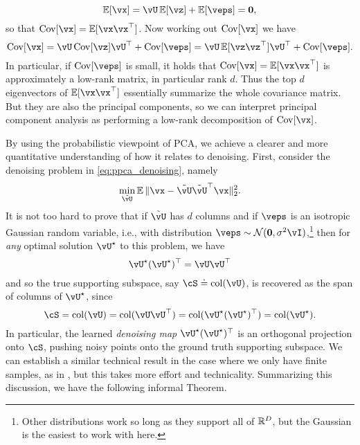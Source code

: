 \documentclass[../../book-main.tex]{subfiles}
\begin{document}
\begin{equation}
    \Ex[\vx] = \vU\Ex[\vz] + \Ex[\veps] = \vzero,
\end{equation}
so that \(\Cov[\vx] = \Ex[\vx\vx^{\top}]\). Now working out \(\Cov[\vx]\) we have 
\begin{equation}
    \Cov[\vx] = \vU\Cov[\vz]\vU^{\top} + \Cov[\veps] = \vU\Ex[\vz\vz^{\top}]\vU^{\top} + \Cov[\veps].
\end{equation}
In particular, if \(\Cov[\veps]\) is small, it holds that \(\Cov[\vx] = \Ex[\vx\vx^{\top}]\) is approximately a low-rank matrix, in particular rank \(d\). Thus the top \(d\) eigenvectors of \(\Ex[\vx\vx^{\top}]\) essentially summarize the whole covariance matrix. But they are also the principal components, so we can interpret principal component analysis as performing a low-rank decomposition of \(\Cov[\vx]\).

\begin{remark}
    By using the probabilistic viewpoint of PCA, we achieve a clearer and more quantitative understanding of how it relates to denoising. First, consider the denoising problem in \eqref{eq:ppca_denoising}, namely
    \begin{equation}
        \min_{\tilde{\vU}}\Ex\norm{\vx - \tilde{\vU}\tilde{\vU}^{\top}\vx}_{2}^{2}.
    \end{equation}
    It is not too hard to prove that if $\tilde{\vU}$ has $d$ columns and if
    \(\veps\) is an isotropic Gaussian
    random variable, i.e., with distribution \(\veps \sim \dNorm(\vzero,
    \sigma^{2}\vI)\),\footnote{Other distributions work so long as they support
    all of \(\mathbb{R}^{D}\), but the Gaussian is the easiest to work with here.} then
    for \textit{any} optimal solution
    \(\vU^{\star}\) to this problem, we have 
    \begin{equation}
        \vU^{\star}(\vU^{\star})^{\top} = \vU\vU^{\top}
    \end{equation}
    and so the true supporting subspace, say \(\cS \doteq \mathop{\mathrm{col}}(\vU)\), is
    recovered as the span of columns of \(\vU^{\star}\), since 
    \begin{equation}
        \cS = \mathop{\mathrm{col}}(\vU) = \mathop{\mathrm{col}}(\vU\vU^{\top})
        = \mathop{\mathrm{col}}(\vU^{\star}(\vU^{\star})^{\top})
        = \mathop{\mathrm{col}}(\vU^{\star}).
    \end{equation}
    In particular, the learned \textit{denoising map} \(\vU^{\star}(\vU^{\star})^{\top}\) is an orthogonal projection onto \(\cS\), pushing noisy points onto the ground truth supporting subspace. We can establish a similar technical result in the case where we only have finite samples, as in , but this takes more effort and technicality. Summarizing this discussion, we have the following informal Theorem.
\end{remark}
\end{document}
